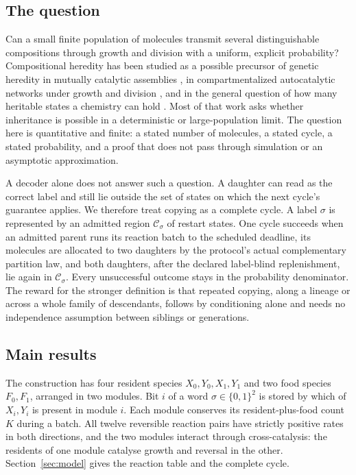\documentclass[11pt,a4paper]{article}
\theoremstyle{plain}
\theoremstyle{definition}
\theoremstyle{remark}
\newcommand{\cC}{\mathcal C}
\begin{document}
\subsection{The question}
Can a small finite population of molecules transmit several distinguishable compositions through growth and division with a uniform, explicit probability? Compositional heredity has been studied as a possible precursor of genetic heredity in mutually catalytic assemblies \citep{segre2000,vasas2012}, in compartmentalized autocatalytic networks under growth and division \citep{matsubara2026,singh2023}, and in the general question of how many heritable states a chemistry can hold \citep{virgo2015}. Most of that work asks whether inheritance is possible in a deterministic or large-population limit. The question here is quantitative and finite: a stated number of molecules, a stated cycle, a stated probability, and a proof that does not pass through simulation or an asymptotic approximation.

A decoder alone does not answer such a question. A daughter can read as the correct label and still lie outside the set of states on which the next cycle's guarantee applies. We therefore treat copying as a complete cycle. A label $\sigma$ is represented by an admitted region $\cC_\sigma$ of restart states. One cycle succeeds when an admitted parent runs its reaction batch to the scheduled deadline, its molecules are allocated to two daughters by the protocol's actual complementary partition law, and both daughters, after the declared label-blind replenishment, lie again in $\cC_\sigma$. Every unsuccessful outcome stays in the probability denominator. The reward for the stronger definition is that repeated copying, along a lineage or across a whole family of descendants, follows by conditioning alone and needs no independence assumption between siblings or generations.

\subsection{Main results}
The construction has four resident species $X_0,Y_0,X_1,Y_1$ and two food species $F_0,F_1$, arranged in two modules. Bit $i$ of a word $\sigma\in\{0,1\}^2$ is stored by which of $X_i,Y_i$ is present in module $i$. Each module conserves its resident-plus-food count $K$ during a batch. All twelve reversible reaction pairs have strictly positive rates in both directions, and the two modules interact through cross-catalysis: the residents of one module catalyse growth and reversal in the other. Section~\ref{sec:model} gives the reaction table and the complete cycle.
\end{document}
